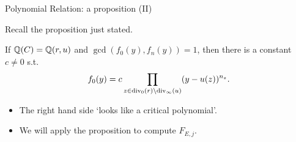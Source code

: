 \documentclass[handout]{beamer}
\begin{document}
\begin{frame}{Polynomial Relation: a proposition (II)}

Recall the proposition just stated.
\begin{Prop}[C.]
\label{mult}
If $\mathbb{Q}(C) = \mathbb{Q}(r,u)$ and $\gcd(f_0(y), f_n(y)) = 1$, then there is a constant $c \neq 0$ s.t.
\[
		f_0(y) = c \prod_{z \in\operatorname{div}_{0}(r) \setminus \operatorname{div}_{\infty}(u)} (y - u(z))^{n_z}.
\]
\end{Prop}


\smallskip
\pause


\begin{itemize} 
\item The right hand side `looks like a critical polynomial'. 


\pause


\item We will apply the proposition to compute $F_{E,j}$. \\

\end{itemize}
\end{frame}
\end{document}
